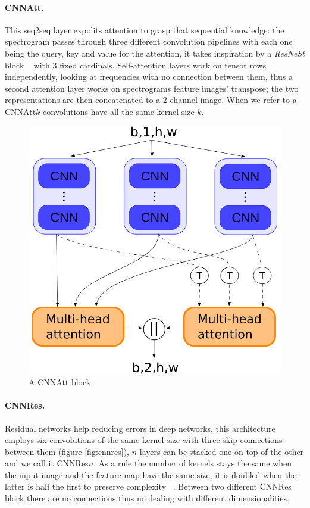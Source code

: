\documentclass{article}
\begin{document}
\paragraph*{CNNAtt.}
This seq2seq layer expolits attention to grasp that sequential knowledge: the spectrogram passes through three different convolution pipelines with each one being the query, key and value for the attention, it takes inspiration by a \textit{ResNeSt} block ~\cite{zhang2020resnest} with 3 fixed cardinals. 
Self-attention layers  work on tensor rows independently, looking at frequencies with no connection between them, thus a second attention layer works on spectrograms feature images' transpose; the two representations are then concatenated to a 2 channel image.
When we refer to a CNNAtt$k$ convolutions have all the same kernel size $k$.

\begin{figure}
    \centering
    \includegraphics[scale=.3]{images/cnn_att.png}
    \caption{A CNNAtt block.}
    \label{fig:cnnatt}
\end{figure}

\paragraph*{CNNRes.}
Residual networks help reducing errors in deep networks, this architecture employs six convolutions of the same kernel size with three skip connections between them (figure \ref{fig:cnnres}), $n$ layers can be stacked one on top of the other and we call it CNNRes$n$.
As a rule the number of kernels stays the same when the input image and the feature map have the same size, it is doubled when the latter is half the first to preserve complexity ~\cite{he2016deep}.
Between two different CNNRes block there are no connections thus no dealing with different dimensionalities. 
\end{document}
